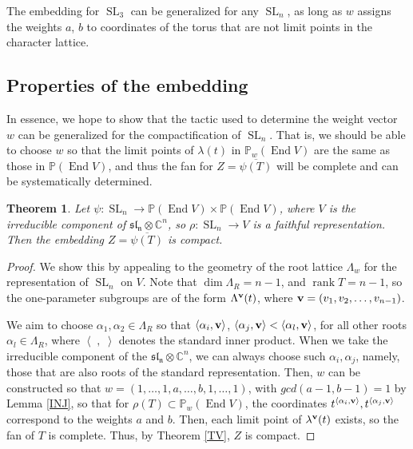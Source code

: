 \documentclass{amsart}
\newcommand{\C}{\mathbb{C}}
\newcommand{\Proj}{\mathbb{P}}
\DeclareMathOperator{\End}{End}
\DeclareMathOperator{\SL}{SL}
\DeclareMathOperator{\rank}{rank}
\newtheorem{theorem}{Theorem}[section]
\theoremstyle{definition}
\theoremstyle{remark}
\numberwithin{equation}{section}
\begin{document}
The embedding for $\SL_3$ can be generalized for any $\SL_n$, as long as $w$ assigns the weights $a$, $b$ to coordinates of the torus that are not limit points in the character lattice. 

\subsection{Properties of the embedding}

In essence, we hope to show that the tactic used to determine the weight vector $w$ can be generalized for the compactification of $\SL_n$. That is, we should be able to choose $w$ so that the limit points of $\lambda(t)$ in $\Proj_w(\End V)$ are the same as those in $\Proj(\End V)$, and thus the fan for $Z = \overline{\psi(T)}$ will be complete and can be systematically determined. 


\begin{theorem} Let $\psi: \SL_n \to \Proj(\End V) \times \Proj(\End V)$, where $V$ is the irreducible component of $\mathfrak{sl_n} \otimes \C^n$, so $\rho: \SL_n \to V$ is a faithful representation. Then the embedding $Z = \overline{\psi(T)}$ is compact.
\end{theorem}
\begin{proof}
We show this by appealing to the geometry of the root lattice $\Lambda_w$ for the representation of $\SL_n$ on $V$. Note that $\dim \Lambda_R = n -1$, and $\rank T = n-1$, so the one-parameter subgroups are of the form $\Lambda^{\bf{v}}(t)$, where ${\bf{v}} = (v_1,v_2,\dots,v_{n-1})$. 

We aim to choose $\alpha_1, \alpha_2 \in \Lambda_R$ so that $\left\langle{\alpha_i, \bf{v}}\right\rangle$, $\left\langle{\alpha_j, \bf{v}}\right\rangle < \left\langle{\alpha_l, \bf{v}}\right\rangle$, for all other roots $\alpha_l \in \Lambda_R$, where $\left\langle{\;,\;}\right\rangle$ denotes the standard inner product. When we take the irreducible component of the $\mathfrak{sl_n} \otimes \C^n$, we can always choose such $\alpha_i, \alpha_j$, namely, those that are also roots of the standard representation. 
Then, $w$ can be constructed so that $w = (1,\ldots,1,a,\ldots,b,1,\ldots,1)$, with $gcd(a-1,b-1) = 1$ by Lemma \ref{INJ}, so that for $\rho(T) \subset  \Proj_w(\End V)$, the coordinates $t^{\left\langle{\alpha_i, \bf{v}}\right\rangle}, t^{\left\langle{\alpha_j, \bf{v}}\right\rangle}$ correspond to the weights $a$ and $b$. Then, each limit point of $\lambda^{\bf{v}}(t)$ exists, so the fan of $T$ is complete. Thus, by Theorem \ref{TV}, $Z$ is compact. 

\end{proof}
\end{document}
